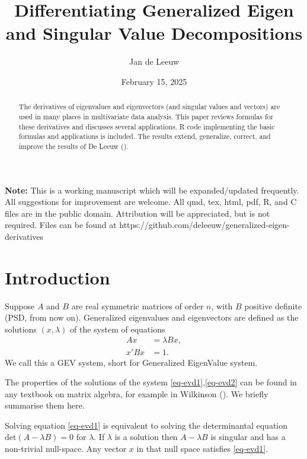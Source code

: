 \documentclass[
  12pt,
  letterpaper,
  DIV=11,
  numbers=noendperiod]{scrartcl}
\title{Differentiating Generalized Eigen and Singular Value
Decompositions}
\author{Jan de Leeuw}
\date{February 15, 2025}
\newcommand{\sectionbreak}{\clearpage}
\renewcommand*\contentsname{Table of contents}
\newcommand\contentsname{Table of contents}
\begin{document}
\maketitle
\begin{abstract}
The derivatives of eigenvalues and eigenvectors (and singular values and
vectors) are used in many places in multivariate data analysis. This
paper reviews formulas for these derivatives and discusses several
applications. R code implementing the basic formulas and applications is
included. The results extend, generalize, correct, and improve the
results of De Leeuw ().
\end{abstract}

\renewcommand*\contentsname{Table of contents}
{
\hypersetup{linkcolor=}
\setcounter{tocdepth}{3}
\tableofcontents
}

\sectionbreak

\textbf{Note:} This is a working manuscript which will be
expanded/updated frequently. All suggestions for improvement are
welcome. All qmd, tex, html, pdf, R, and C files are in the public
domain. Attribution will be appreciated, but is not required. Files can
be found at https://github.com/deleeuw/generalized-eigen-derivatives

\sectionbreak

\section{Introduction}\label{sec-intro}

Suppose \(A\) and \(B\) are real symmetric matrices of order \(n\), with
\(B\) positive definite (PSD, from now on). Generalized eigenvalues and
eigenvectors are defined as the solutions \((x,\lambda)\) of the system
of equations \begin{subequations}
\begin{align}
Ax&=\lambda Bx,\label{eq-evd1}\\
x'Bx&=1.\label{eq-evd2}
\end{align}
\end{subequations} We call this a GEV system, short for Generalized
EigenValue system.

The properties of the solutions of the system
\eqref{eq-evd1},\eqref{eq-evd2} can be found in any textbook on matrix
algebra, for example in Wilkinson ().
We briefly summarise them here.

Solving equation \eqref{eq-evd1} is equivalent to solving the
determinantal equation \(\text{det}(A-\lambda B)=0\) for \(\lambda\). If
\(\lambda\) is a solution then \(A-\lambda B\) is singular and has a
non-trivial null-space. Any vector \(x\) in that null space satisfies
\eqref{eq-evd1}.
\end{document}
